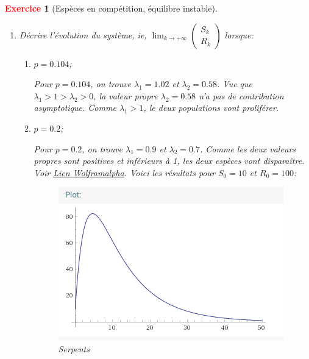 \documentclass[11pt]{article}
\theoremstyle{mythmstyle}
\newtheorem{exo}{\textcolor{red}{\textbf{Exercice}}}
\newcommand{\R}{\mathbb{R}}
\begin{document}
\begin{exo}[Espèces en compétition, équilibre instable]
\begin{enumerate}
\begin{solution}
    $$\Delta=(-1.6)^2 - 4.(0.55+0.4p)=0.36 - 1.6p$$ 
    
    Donc pour avoir des valeurs propres réels il faut que 
    
    $$
    0.36-1.6p>0 \Leftrightarrow 1.6p<0.36 \Leftrightarrow p< 0.225
    $$
    Donc $\lambda_1= \frac{1.6+ \sqrt{0.36-1.6p}}{2}$ et $\lambda_2=\frac{1.6- \sqrt{0.36-1.6p}}{2}$.
\end{solution}
    \item Décrire l’évolution du système, ie, $\lim_{k\to+\infty} \begin{pmatrix}S_k\\R_k\end{pmatrix}$ lorsque:
\begin{enumerate}    
     \item $p=0.104$;
\begin{solution}
    Pour $p=0.104$, on trouve $\lambda_1= 1.02$ et $\lambda_2=0.58$. Vue que $\lambda_1>1>\lambda_2>0$,
    la valeur propre $\lambda_2=0.58$ n'a pas de contribution asymptotique. Comme $\lambda_1>1$, le deux populations vont proliférer.
\end{solution}
    \item $p=0.2$;
\begin{solution}
    Pour $p=0.2$, on trouve $\lambda_1= 0.9$ et $\lambda_2=0.7$. Comme les deux valeurs propres sont positives et inférieurs à 1, 
les deux espèces vont disparaître. Voir 
\href{https://www.wolframalpha.com/input/?i=u%28n%2B1%29%3D0.5*u%28n%29%2B0.4*v%28n%29%2C+v%28n%2B1%29%3D-0.2*u%28n%29%2B%281.1%29*v%28n%29}{Lien Wolframalpha}. 
Voici les résultats pour $S_0=10$ et $R_0=100$:

\begin{figure}[H]
\begin{center}
\includegraphics[scale=0.5]{serpentsp02.png}
\caption{Serpents}
\end{center}
\end{figure}
        

\end{solution}
\end{enumerate}
\end{enumerate}
\end{exo}
\end{document}
